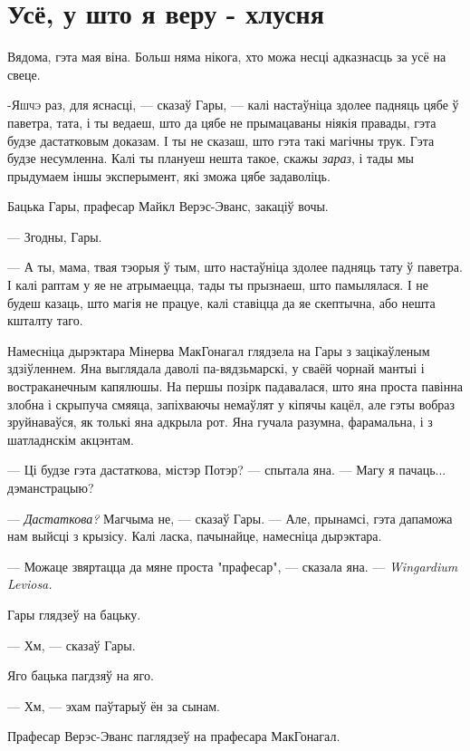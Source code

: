 
\chapter{Усё, у што я веру - хлусня}


\begin{chapterOpeningQuote}
    Вядома, гэта мая віна. Больш няма нікога, хто можа несці адказнасць
    за усё на свеце.
\end{chapterOpeningQuote}


\lettrine{-Я}{шчэ} раз, для яснасці, --- сказаў Гары, --- калі настаўніца здолее падняць
цябе ў паветра, тата, і ты ведаеш, што да цябе не прымацаваны ніякія правады, гэта будзе 
дастатковым доказам. І ты не сказаш, што гэта такі магічны трук. Гэта будзе несумленна.
Калі ты плануеш нешта такое, скажы \emph{зараз}, і тады мы прыдумаем іншы эксперымент, які 
зможа цябе задаволіць.

Бацька Гары, прафесар Майкл Верэс-Эванс, закаціў вочы. 

--- Згодны, Гары.

--- А ты, мама, твая тэорыя ў тым, што настаўніца здолее падняць тату ў паветра. І калі раптам
у яе не атрымаецца, тады ты прызнаеш, што памылялася. І не будеш казаць, што магія
не працуе, калі ставіцца да яе скептычна, або нешта кшталту таго.

Намесніца дырэктара Мінерва МакГонагал глядзела на Гары з зацікаўленым здзіўленнем. Яна выглядала
даволі па-вядзьмарскі, у сваёй чорнай мантыі і востраканечным капялюшы. На першы позірк падавалася,
што яна проста павінна злобна і скрыпуча смяяца, запіхваючы немаўлят у кіпячы кацёл, але гэты
вобраз зруйнаваўся, як толькі яна адкрыла рот. Яна гучала разумна, фарамальна, і з
шатладнскім акцэнтам.

--- Ці будзе гэта дастаткова, містэр Потэр? --- спытала яна. --- Магу я пачаць... дэманстрацыю?

--- \emph{Дастаткова?} Магчыма не, --- сказаў Гары. --- Але, прынамсі, гэта дапаможа нам выйсці з
крызісу. Калі ласка, пачынайце, намесніца дырэктара.

--- Можаце звяртацца да мяне проста "прафесар", --- сказала яна. --- \emph{Wingardium Leviosa.}

Гары глядзеў на бацьку.

--- Хм, --- сказаў Гары.

Яго бацька пагдзяў на яго. 

--- Хм, --- эхам паўтарыў ён за сынам.

Прафесар Верэс-Эванс паглядзеў на прафесара МакГонагал. 

